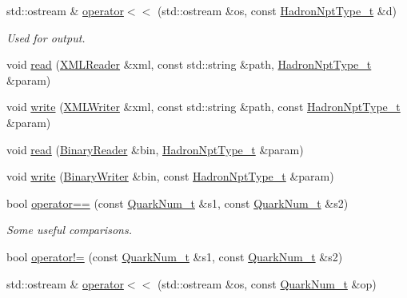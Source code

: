 \begin{DoxyCompactItemize}
std\+::ostream \& \mbox{\hyperlink{namespaceHadron_ae2a5c7a5ffdda238337fd194679743a6}{operator$<$$<$}} (std\+::ostream \&os, const \mbox{\hyperlink{structHadron_1_1HadronNptType__t}{Hadron\+Npt\+Type\+\_\+t}} \&d)
\begin{DoxyCompactList}\small\item\em Used for output. \end{DoxyCompactList}\item 
void \mbox{\hyperlink{namespaceHadron_ae9e95e7c9b97a878e77c48ea5619a53a}{read}} (\mbox{\hyperlink{classADATXML_1_1XMLReader}{X\+M\+L\+Reader}} \&xml, const std\+::string \&path, \mbox{\hyperlink{structHadron_1_1HadronNptType__t}{Hadron\+Npt\+Type\+\_\+t}} \&param)
\item 
void \mbox{\hyperlink{namespaceHadron_a3ba652c4917e69b9056f2dd7621483df}{write}} (\mbox{\hyperlink{classADATXML_1_1XMLWriter}{X\+M\+L\+Writer}} \&xml, const std\+::string \&path, const \mbox{\hyperlink{structHadron_1_1HadronNptType__t}{Hadron\+Npt\+Type\+\_\+t}} \&param)
\item 
void \mbox{\hyperlink{namespaceHadron_a7f12085b340a6e0bfb52b3d920cfeb1e}{read}} (\mbox{\hyperlink{classADATIO_1_1BinaryReader}{Binary\+Reader}} \&bin, \mbox{\hyperlink{structHadron_1_1HadronNptType__t}{Hadron\+Npt\+Type\+\_\+t}} \&param)
\item 
void \mbox{\hyperlink{namespaceHadron_a0051134178fb8346e89720a478b8a8f1}{write}} (\mbox{\hyperlink{classADATIO_1_1BinaryWriter}{Binary\+Writer}} \&bin, const \mbox{\hyperlink{structHadron_1_1HadronNptType__t}{Hadron\+Npt\+Type\+\_\+t}} \&param)
\item 
bool \mbox{\hyperlink{namespaceHadron_a6a6810ed7f262fbb4167534023c0b191}{operator==}} (const \mbox{\hyperlink{structHadron_1_1QuarkNum__t}{Quark\+Num\+\_\+t}} \&s1, const \mbox{\hyperlink{structHadron_1_1QuarkNum__t}{Quark\+Num\+\_\+t}} \&s2)
\begin{DoxyCompactList}\small\item\em Some useful comparisons. \end{DoxyCompactList}\item 
bool \mbox{\hyperlink{namespaceHadron_aa7483984b4c081a23ba486c97ca05f5a}{operator!=}} (const \mbox{\hyperlink{structHadron_1_1QuarkNum__t}{Quark\+Num\+\_\+t}} \&s1, const \mbox{\hyperlink{structHadron_1_1QuarkNum__t}{Quark\+Num\+\_\+t}} \&s2)
\item 
std\+::ostream \& \mbox{\hyperlink{namespaceHadron_a99d886a5455746fba4c549c7a072c731}{operator$<$$<$}} (std\+::ostream \&os, const \mbox{\hyperlink{structHadron_1_1QuarkNum__t}{Quark\+Num\+\_\+t}} \&op)

\end{DoxyCompactItemize}
